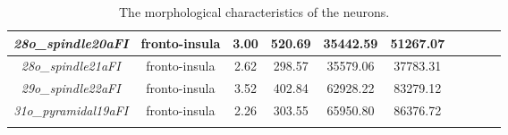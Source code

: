 \begin{longtable}{|c|c|c|c|c|c|c|c|c|c|}
	\textit{28o\_spindle20aFI}    & fronto-insula      & 3.00                      & 520.69                    & 35442.59                  & 51267.07                  \\ \hline
	\textit{28o\_spindle21aFI}    & fronto-insula      & 2.62                      & 298.57                    & 35579.06                  & 37783.31                  \\ \hline
	\textit{29o\_spindle22aFI}    & fronto-insula      & 3.52                      & 402.84                    & 62928.22                  & 83279.12                  \\ \hline
	\textit{31o\_pyramidal19aFI}  & fronto-insula      & 2.26                      & 303.55                    & 65950.80                  & 86376.72                  \\ \hline
	\caption{The morphological characteristics of the neurons.} \label{table:morphological}
\end{longtable}
